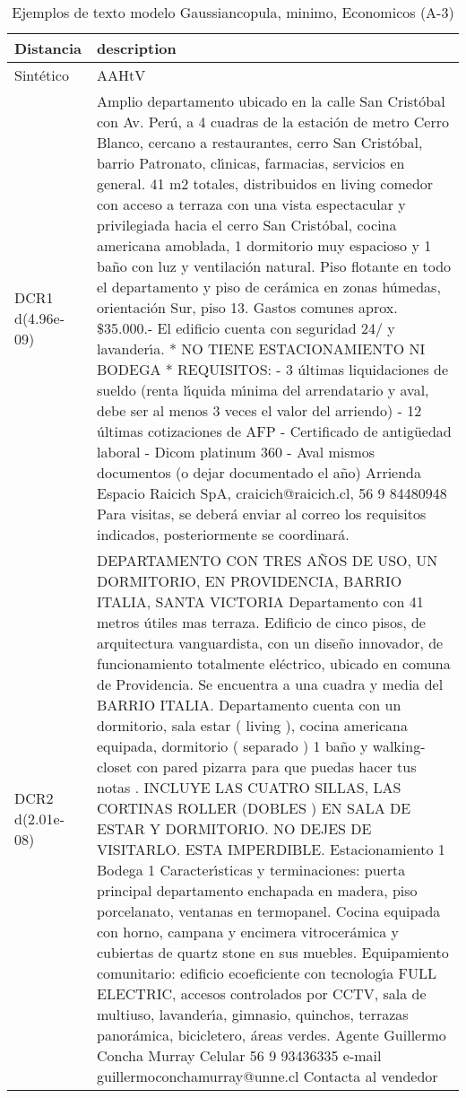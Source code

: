\begin{table}[H]
\centering
\fontsize{10}{14}\selectfont
\caption{Ejemplos de texto modelo Gaussiancopula, minimo, Economicos (A-3)}
\label{table-example-economicos-a-3-gaussiancopula-min-text}
\begin{tabular}{|l|m{35em}|}
\hline
\rowcolor[gray]{0.8}
Distancia & description \\
\hline Sintético & AAHtV \\
\hline DCR1 d(4.96e-09) & Amplio departamento ubicado en la calle San Crist\'obal con Av. Per\'u, a 4 cuadras de la estaci\'on de metro Cerro Blanco, cercano a restaurantes, cerro San Crist\'obal, barrio Patronato, cl{\'\i}nicas, farmacias, servicios en general. 41 m2 totales, distribuidos en living comedor con acceso a terraza con una vista espectacular y privilegiada hacia el cerro San Crist\'obal, cocina americana amoblada, 1 dormitorio muy espacioso y 1 ba\~no con luz y ventilaci\'on natural. Piso flotante en todo el departamento y piso de cer\'amica en zonas h\'umedas, orientaci\'on Sur, piso 13. Gastos comunes aprox. \$35.000.- El edificio cuenta con seguridad 24/ y lavander{\'\i}a. * NO TIENE ESTACIONAMIENTO NI BODEGA  * REQUISITOS: - 3 \'ultimas liquidaciones de sueldo (renta l{\'\i}quida m{\'\i}nima del arrendatario y aval, debe ser al menos 3 veces el valor del arriendo) - 12 \'ultimas cotizaciones de AFP - Certificado de antig\"uedad laboral - Dicom platinum 360 - Aval mismos documentos (o dejar documentado el a\~no)  Arrienda Espacio Raicich SpA, craicich@raicich.cl, 56 9 84480948 Para visitas, se deber\'a enviar al correo los requisitos indicados, posteriormente se coordinar\'a. \\
\hline DCR2 d(2.01e-08) & DEPARTAMENTO CON TRES A\~NOS DE USO, UN DORMITORIO, EN PROVIDENCIA, BARRIO ITALIA, SANTA VICTORIA  Departamento con 41 metros \'utiles mas terraza. Edificio de cinco pisos, de arquitectura vanguardista, con un dise\~no innovador, de funcionamiento totalmente el\'ectrico, ubicado en comuna de Providencia. Se encuentra a una cuadra y media del BARRIO ITALIA. Departamento cuenta con un dormitorio, sala estar ( living ), cocina americana equipada, dormitorio ( separado ) 1 ba\~no y walking-closet con pared pizarra para que puedas hacer tus notas . INCLUYE LAS CUATRO SILLAS, LAS CORTINAS ROLLER (DOBLES ) EN SALA DE ESTAR Y DORMITORIO. NO DEJES DE VISITARLO. ESTA IMPERDIBLE.   Estacionamiento 1 Bodega 1  Caracter{\'\i}sticas y terminaciones: puerta principal departamento enchapada en madera, piso porcelanato, ventanas en termopanel. Cocina equipada con horno, campana y encimera vitrocer\'amica y cubiertas de quartz stone en sus muebles.  Equipamiento comunitario: edificio ecoeficiente con tecnolog{\'\i}a FULL ELECTRIC, accesos controlados por CCTV, sala de multiuso, lavander{\'\i}a, gimnasio, quinchos, terrazas panor\'amica, bicicletero, \'areas verdes.   Agente Guillermo Concha Murray Celular 56 9 93436335 e-mail guillermoconchamurray@unne.cl Contacta al vendedor \\
\hline
\end{tabular}
\end{table}
